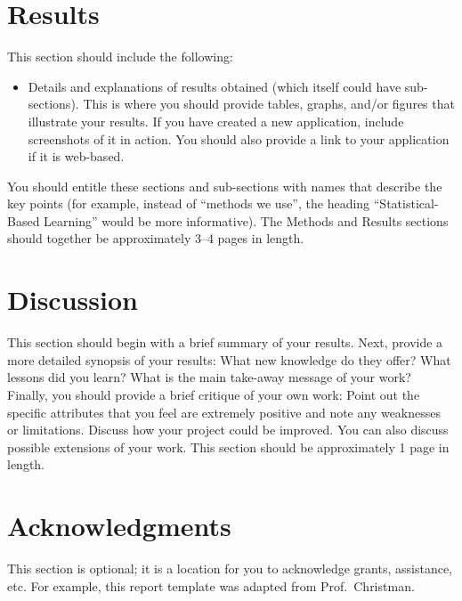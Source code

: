 \documentclass{sig-alternate-05-2015}
\begin{document}
\section{Results}

This section should include the following:

\begin{itemize}

	
	\item Details and explanations of results obtained (which itself could have
		sub-sections). This is where you should provide tables, graphs, and/or
		figures that illustrate your results. If you have created a new
		application, include screenshots of it in action. You should also provide a
		link to your application if it is web-based.

\end{itemize}

You should entitle these sections and sub-sections with names that describe the
key points (for example, instead of ``methods we use'', the heading
``Statistical-Based Learning'' would be more informative). The Methods and
Results sections should together be approximately 3--4 pages in length.


\section{Discussion}

This section should begin with a brief summary of your results. Next, provide a
more detailed synopsis of your results: What new knowledge do they offer? What
lessons did you learn? What is the main take-away message of your work?
Finally, you should provide a brief critique of your own work: Point out the
specific attributes that you feel are extremely positive and note any
weaknesses or limitations. Discuss how your project could be improved. You can
also discuss possible extensions of your work. This section should be
approximately 1 page in length.


\section{Acknowledgments}

This section is optional; it is a location for you to acknowledge grants,
assistance, etc. For example, this report template was adapted from Prof.~Christman.


\end{document}
